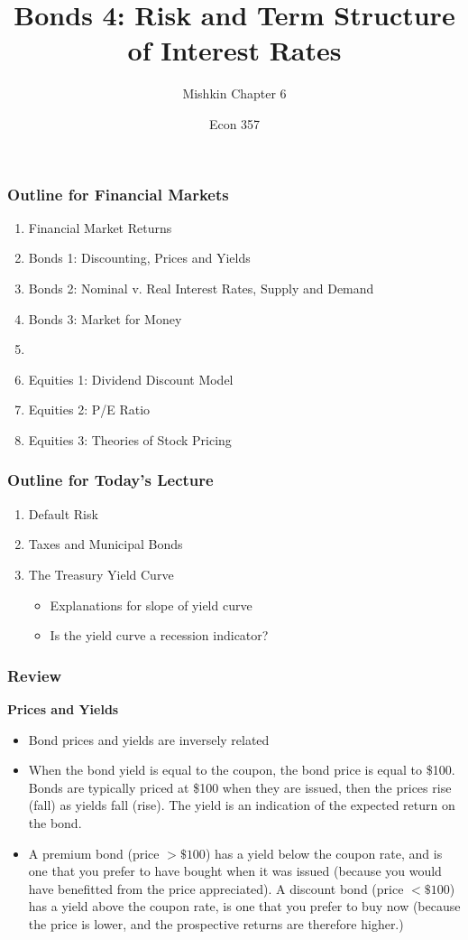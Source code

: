 \documentclass{beamer}
\title{Bonds 4: Risk and Term Structure of Interest Rates}
\subtitle{Mishkin Chapter 6}
\author{Econ 357}
\date{\week}
\begin{document}
\frame{\titlepage}

\begin{frame}
    \frametitle{Outline for Financial Markets}
        \begin{enumerate}
            \item Financial Market Returns
            \item Bonds 1: Discounting, Prices and Yields
            \item Bonds 2: Nominal v. Real Interest Rates, Supply and Demand
            \item Bonds 3: Market for Money
            \item {}
            \item Equities 1: Dividend Discount Model
            \item Equities 2: P/E Ratio
            \item Equities 3: Theories of Stock Pricing
            
        \end{enumerate}
\end{frame}


\begin{frame}
    \frametitle{Outline for Today's Lecture}
    \begin{enumerate}
        \item Default Risk
        \item Taxes and Municipal Bonds
        \item The Treasury Yield Curve
        \begin{itemize}
            \item Explanations for slope of yield curve
            \item Is the yield curve a recession indicator?
        \end{itemize}
    \end{enumerate}

\end{frame}

\begin{frame}[t]
    \frametitle{Review}

    \textbf{Prices and Yields}
    \begin{itemize}
        \item Bond prices and yields are inversely related
        \item When the bond yield is equal to the coupon, the bond price is equal to \$100.   Bonds are typically priced at \$100 when they are issued, then the prices rise (fall) as yields fall (rise).  The yield is an indication of the expected return on the bond.
        \item A premium bond (price $>\$100$) has a yield below the coupon rate, and is one that you prefer to have bought when it was issued (because you would have benefitted from the price appreciated).   A discount bond (price $<\$100$) has a yield above the coupon rate, is one that you prefer to buy now (because the price is lower, and the prospective returns are therefore higher.)
    \end{itemize}


\end{frame}
\end{document}
